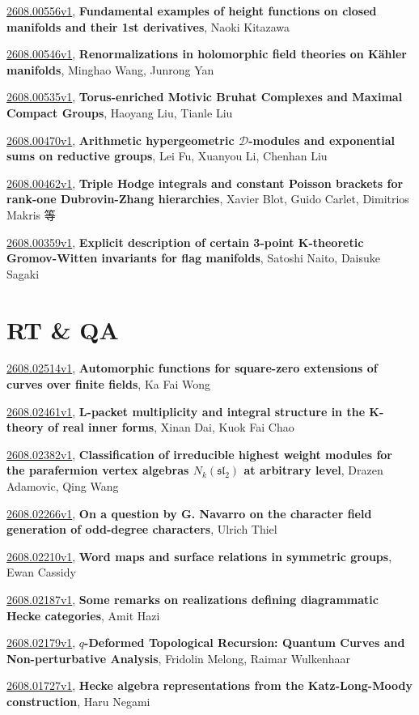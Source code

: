 \documentclass[9pt, a4paper]{article}
\theoremstyle{plain}
\theoremstyle{definition}
\theoremstyle{remark}
\newcommand{\arxiv}[3]{\href{https://arxiv.org/abs/#1}{#1}, \textbf{\textcolor{arxivblue}{#2}}, #3}
\begin{document}
\arxiv{2608.00556v1}{Fundamental examples of height functions on closed manifolds and their 1st derivatives}{Naoki Kitazawa}

\arxiv{2608.00546v1}{Renormalizations in holomorphic field theories on Kähler manifolds}{Minghao Wang, Junrong Yan}

\arxiv{2608.00535v1}{Torus-enriched Motivic Bruhat Complexes and Maximal Compact Groups}{Haoyang Liu, Tianle Liu}

\arxiv{2608.00470v1}{Arithmetic hypergeometric $\mathcal {D}$-modules and exponential sums on reductive groups}{Lei Fu, Xuanyou Li, Chenhan Liu}

\arxiv{2608.00462v1}{Triple Hodge integrals and constant Poisson brackets for rank-one Dubrovin-Zhang hierarchies}{Xavier Blot, Guido Carlet, Dimitrios Makris 等}

\arxiv{2608.00359v1}{Explicit description of certain 3-point K-theoretic Gromov-Witten invariants for flag manifolds}{Satoshi Naito, Daisuke Sagaki}


\section{RT \& QA}
\arxiv{2608.02514v1}{Automorphic functions for square-zero extensions of curves over finite fields}{Ka Fai Wong}

\arxiv{2608.02461v1}{L-packet multiplicity and integral structure in the K-theory of real inner forms}{Xinan Dai, Kuok Fai Chao}

\arxiv{2608.02382v1}{Classification of irreducible highest weight modules for the parafermion vertex algebras $N_k(\mathfrak{sl}_2)$ at arbitrary level}{Drazen Adamovic, Qing Wang}

\arxiv{2608.02266v1}{On a question by G. Navarro on the character field generation of odd-degree characters}{Ulrich Thiel}

\arxiv{2608.02210v1}{Word maps and surface relations in symmetric groups}{Ewan Cassidy}

\arxiv{2608.02187v1}{Some remarks on realizations defining diagrammatic Hecke categories}{Amit Hazi}

\arxiv{2608.02179v1}{$q$-Deformed Topological Recursion: Quantum Curves and Non-perturbative Analysis}{Fridolin Melong, Raimar Wulkenhaar}

\arxiv{2608.01727v1}{Hecke algebra representations from the Katz-Long-Moody construction}{Haru Negami}
\end{document}
